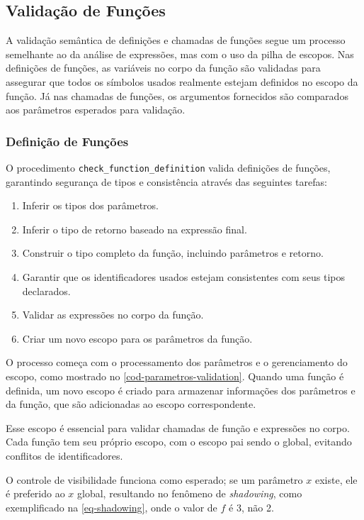 


\subsection{Validação de Funções}
A validação semântica de definições e chamadas de funções segue um processo semelhante ao da análise de expressões, mas com o uso da pilha de escopos.
Nas definições de funções, as variáveis no corpo da função são validadas para assegurar que todos os símbolos usados realmente estejam definidos no escopo da função. Já nas chamadas de funções, os argumentos fornecidos são comparados aos parâmetros esperados para validação.

\subsubsection{Definição de Funções} \label{subsubsection-eq-func-defn}

O procedimento \verb"check_function_definition" valida definições de funções, garantindo segurança de tipos e consistência através das seguintes tarefas:

\begin{enumerate}
    \item Inferir os tipos dos parâmetros.
    \item Inferir o tipo de retorno baseado na expressão final.
    \item Construir o tipo completo da função, incluindo parâmetros e retorno.
    \item Garantir que os identificadores usados estejam consistentes com seus tipos declarados.
    \item Validar as expressões no corpo da função.
    \item Criar um novo escopo para os parâmetros da função.
\end{enumerate}

O processo começa com o processamento dos parâmetros e o gerenciamento do escopo, como mostrado no \autoref{cod-parametros-validation}. Quando uma função é definida, um novo escopo é criado para armazenar informações dos parâmetros e da função, que são adicionadas ao escopo correspondente.

Esse escopo é essencial para validar chamadas de função e expressões no corpo. Cada função tem seu próprio escopo, com o escopo pai sendo o global, evitando conflitos de identificadores.

O controle de visibilidade funciona como esperado; se um parâmetro $x$ existe, ele é preferido ao $x$ global, resultando no fenômeno de \textit{shadowing}, como exemplificado na \autoref{eq-shadowing}, onde o valor de $f$ é 3, não 2.

